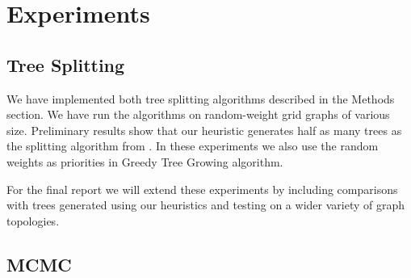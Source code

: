 \documentclass{article} %
\begin{document}
\section{Experiments}

\subsection{Tree Splitting}%

We have implemented both tree splitting algorithms described in the Methods section. 
We have run the algorithms on random-weight grid graphs of various size. 
Preliminary results show that our heuristic generates half as many trees as the splitting algorithm from \cite{rivasseau2005jungle}.
In these experiments we also use the random weights as priorities in Greedy Tree Growing algorithm.

For the final report we will extend these experiments by including comparisons
with trees generated using our heuristics and testing on a wider variety of
graph topologies. 


\subsection{MCMC}%
\end{document}
